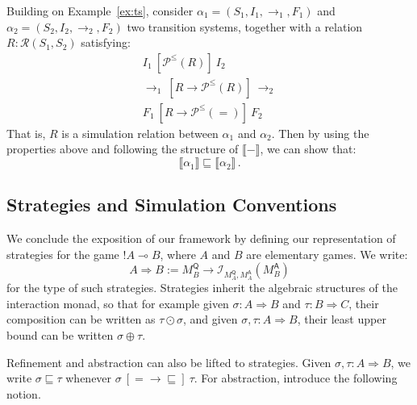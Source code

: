 \documentclass[acmsmall,timestamp,review,anonymous]{acmart}
\newcommand{\kw}[1]{\ensuremath{ \mathsf{#1} }}
\newcommand{\ifr}[1]{\ [{#1}]\ }
\begin{document}
\begin{example} \label{ex:tssim}
Building on Example~\ref{ex:ts},
consider
$\alpha_1 = (S_1, I_1, {\rightarrow}_1, F_1)$ and
$\alpha_2 = (S_2, I_2, {\rightarrow}_2, F_2)$
two transition systems,
together with a relation
$R : \mathcal{R}(S_1, S_2)$
satisfying:
\begin{gather*}
  I_1 \ifr{\mathcal{P}^\le(R)} I_2 \\
  {\rightarrow}_1 \ifr{R \rightarrow \mathcal{P}^\le(R)} {\rightarrow}_2 \\
  F_1 \ifr{R \rightarrow \mathcal{P}^\le(=)} F_2
\end{gather*}
That is, $R$ is a simulation relation between $\alpha_1$ and $\alpha_2$.
Then by using the properties above and
following the structure of $\llbracket - \rrbracket$,
we can show that:
\[
    \llbracket \alpha_1 \rrbracket \sqsubseteq
    \llbracket \alpha_2 \rrbracket \,.
\]
\end{example}


\subsection{Strategies and Simulation Conventions} \label{sec:monad:games} %

We conclude the exposition of our framework
by defining our representation
of strategies for the game $!A \multimap B$,
where $A$ and $B$ are elementary games.
We write:
\[ A \Rightarrow B := M_B^\kw{Q} \rightarrow
   \mathcal{I}_{M_A^\kw{Q},M_A^\kw{A}}(M_B^\kw{A}) \]
for the type of such strategies.
Strategies inherit the algebraic structures
of the interaction monad,
so that for example
given $\sigma : A \Rightarrow B$ and $\tau : B \Rightarrow C$,
their composition can be written as $\tau \odot \sigma$, and
given $\sigma, \tau : A \Rightarrow B$,
their least upper bound
can be written $\sigma \oplus \tau$.

Refinement and abstraction can also be lifted to strategies.
Given $\sigma, \tau : A \Rightarrow B$,
we write $\sigma \sqsubseteq \tau$
whenever $\sigma \ifr{{=} \rightarrow {\sqsubseteq}} \tau$.
For abstraction, introduce the following notion.
\end{document}
